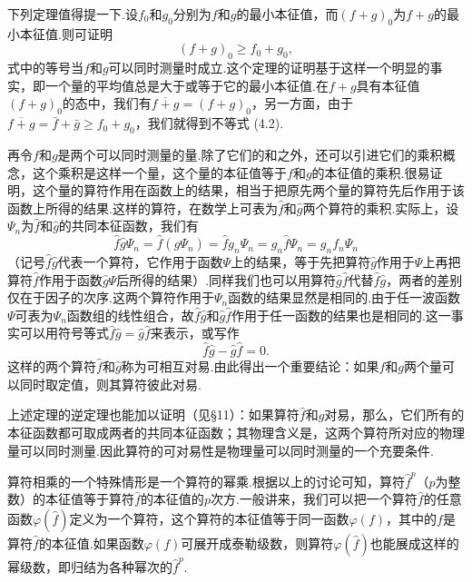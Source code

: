 下列定理值得提一下.设$f_0$和$g_0$分别为$f$和$g$的最小本征值，而$(f+g)_0$为$f+g$的最小本征值.则可证明
\begin{equation}
  (f+g)_0\geqslant f_0+g_0,
\end{equation}
式中的等号当$f$和$g$可以同时测量时成立.这个定理的证明基于这样一个明显的事实，即一个量的平均值总是大于或等于它的最小本征值.在$f+g$具有本征值$(f+g)_0$的态中，我们有$\overline{f+g}=(f+g)_0$，另一方面，由于$\overline{f+g}=\bar{f}+\bar{g}\geqslant f_0+g_0$，我们就得到不等式 (4.2).

再令$f$和$g$是两个可以同时测量的量.除了它们的和之外，还可以引进它们的乘积概念，这个乘积是这样一个量，这个量的本征值等于$f$和$g$的本征值的乘积.很易证明，这个量的算符作用在函数上的结果，相当于把原先两个量的算符先后作用于该函数上所得的结果.这样的算符，在数学上可表为$\hat{f}$和$\hat{g}$两个算符的乘积.实际上，设$\varPsi_n$为$\hat{f}$和$\hat{g}$的共同本征函数，我们有
\begin{equation*}
  \hat{f}\hat{g}\varPsi_n=\hat{f}(\hat{g}\varPsi_n)
  =\hat{f}g_n\varPsi_n=g_n\hat{f}\varPsi_n=g_nf_n\varPsi_n
\end{equation*}
（记号$\hat{f}\hat{g}$代表一个算符，它作用于函数$\varPsi$上的结果，等于先把算符$\hat{g}$作用于$\varPsi$上再把算符$\hat{f}$作用于函数$\hat{g}\varPsi$后所得的结果）.同样我们也可以用算符$\hat{g}\hat{f}$代替$\hat{f}\hat{g}$，两者的差别仅在于因子的次序.这两个算符作用于$\varPsi_n$函数的结果显然是相同的.由于任一波函数$\varPsi$可表为$\varPsi_n$函数组的线性组合，故$\hat{f}\hat{g}$和$\hat{g}\hat{f}$作用于任一函数的结果也是相同的.这一事实可以用符号等式$\hat{f}\hat{g}=\hat{g}\hat{f}$来表示，或写作
\begin{equation}
  \hat{f}\hat{g}-\hat{g}\hat{f}=0.
\end{equation}
这样的两个算符$\hat{f}$和$\hat{g}$称为可相互对易.由此得出一个重要结论：如果$f$和$g$两个量可以同时取定值，则其算符彼此对易.

上述定理的逆定理也能加以证明（见§11）：如果算符$\hat{f}$和$\hat{g}$对易，那么，它们所有的本征函数都可取成两者的共同本征函数；其物理含义是，这两个算符所对应的物理量可以同时测量.因此算符的可对易性是物理量可以同时测量的一个充要条件.

算符相乘的一个特殊情形是一个算符的幂乘.根据以上的讨论可知，算符$\hat{f}^{p}$（$p$为整数）的本征值等于算符$\hat{f}$的本征值的$p$次方.一般讲来，我们可以把一个算符$\hat{f}$的任意函数$\varphi(\hat{f})$定义为一个算符，这个算符的本征值等于同一函数$\varphi(f)$，其中的$f$是算符$\hat{f}$的本征值.如果函数$\varphi(f)$可展开成泰勒级数，则算符$\varphi(\hat{f})$也能展成这样的幂级数，即归结为各种幂次的$\hat{f}^{p}$.


